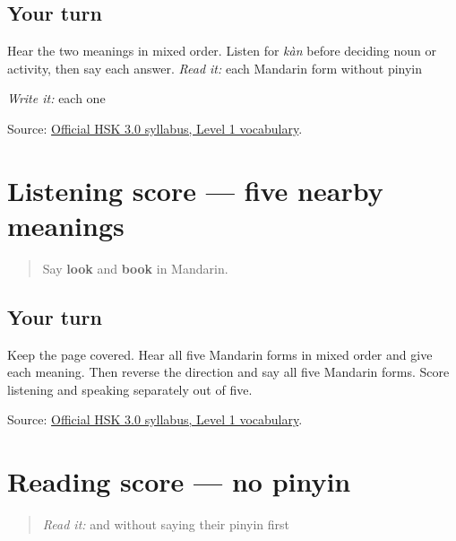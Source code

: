 \subsection*{Your turn}
Hear the two meanings in mixed order. Listen for \emph{kàn} before deciding noun or activity, then say each answer. \emph{Read it:} each Mandarin form without pinyin

\emph{Write it:} each one

\begin{tcolorbox}[breakable,colback=teal!4,colframe=teal!35!black,title={Before you move on}]
Source: \href{https://hsk.cn-bj.ufileos.com/3.0/\%E6\%96\%B0\%E7\%89\%88HSK\%E8\%80\%83\%E8\%AF\%95\%E5\%A4\%A7\%E7\%BA\%B21219.pdf}{Official HSK 3.0 syllabus, Level 1 vocabulary}.
\end{tcolorbox}
\section[Practice]{Listening score — five nearby meanings}

\label{lesson:ZH-R18-listening-five}



\begin{quote}
Say \textbf{look} and \textbf{book} in Mandarin.
\end{quote}

\subsection*{Your turn}
Keep the page covered. Hear all five Mandarin forms in mixed order and give each meaning. Then reverse the direction and say all five Mandarin forms. Score listening and speaking separately out of five.

\begin{tcolorbox}[breakable,colback=teal!4,colframe=teal!35!black,title={Before you move on}]
Source: \href{https://hsk.cn-bj.ufileos.com/3.0/\%E6\%96\%B0\%E7\%89\%88HSK\%E8\%80\%83\%E8\%AF\%95\%E5\%A4\%A7\%E7\%BA\%B21219.pdf}{Official HSK 3.0 syllabus, Level 1 vocabulary}.
\end{tcolorbox}
\section[Practice]{Reading score — no pinyin}

\label{lesson:ZH-R18-reading-five}



\begin{quote}
\emph{Read it:} \textbf{} and \textbf{} without saying their pinyin first
\end{quote}

